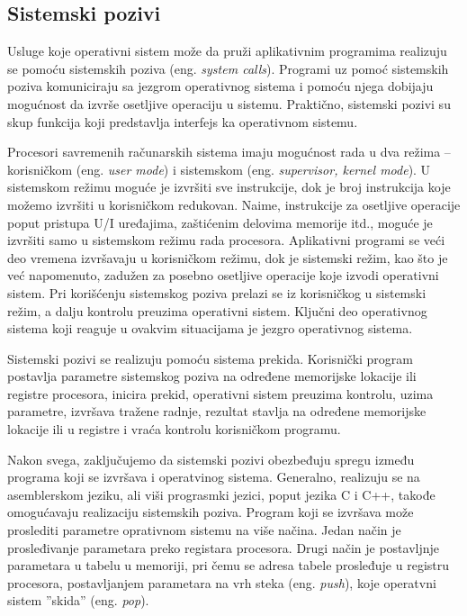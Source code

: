 \documentclass[12pt,oneside]{memoir}
\theoremstyle{plain}
\theoremstyle{definition}
\begin{document}
\subsection*{Sistemski pozivi}
Usluge koje operativni sistem može da pruži aplikativnim programima realizuju se pomoću sistemskih poziva (eng. \textit{system calls}). Programi uz pomoć sistemskih poziva komuniciraju sa jezgrom operativnog sistema i pomoću njega dobijaju mogućnost da izvrše osetljive operaciju u sistemu. Praktično, sistemski pozivi su skup funkcija koji predstavlja interfejs ka operativnom sistemu. 

Procesori savremenih računarskih sistema imaju mogućnost rada u dva režima – korisničkom (eng. \textit{user mode}) i sistemskom (eng. \textit{supervisor, kernel mode}). U sistemskom režimu moguće je izvršiti sve instrukcije, dok je broj instrukcija koje možemo izvršiti u korisničkom redukovan. Naime, instrukcije za osetljive operacije poput pristupa U/I uređajima, zaštićenim delovima memorije itd., moguće je izvršiti samo u sistemskom režimu rada procesora. Aplikativni programi se veći deo vremena izvršavaju u korisničkom režimu, dok je sistemski režim, kao što je već napomenuto, zadužen za posebno osetljive operacije koje izvodi operativni sistem. Pri korišćenju sistemskog poziva prelazi se iz korisničkog u sistemski režim, a dalju kontrolu preuzima operativni sistem. Ključni deo operativnog sistema koji reaguje u ovakvim situacijama je jezgro operativnog sistema.

Sistemski pozivi se realizuju pomoću sistema prekida.  Korisnički program postavlja parametre sistemskog poziva na određene memorijske lokacije ili registre procesora, inicira prekid, operativni sistem preuzima kontrolu, uzima parametre, izvršava tražene radnje, rezultat stavlja na određene memorijske lokacije ili u registre i vraća kontrolu korisničkom programu.

Nakon svega, zaključujemo da sistemski pozivi obezbeđuju spregu između programa koji se izvršava i operatvinog sistema. Generalno, realizuju se na asemblerskom jeziku, ali viši prograsmki jezici, poput jezika C i C++, takođe omogućavaju realizaciju sistemskih poziva. Program koji se izvršava može proslediti parametre oprativnom sistemu na više načina. Jedan način je prosleđivanje parametara preko registara procesora. Drugi način je  postavljnje parametara u tabelu u memoriji, pri čemu se adresa tabele prosleđuje u registru procesora, postavljanjem parametara na vrh steka (eng. \textit{push}), koje operatvni sistem ''skida'' (eng. \textit{pop}).
\end{document}
